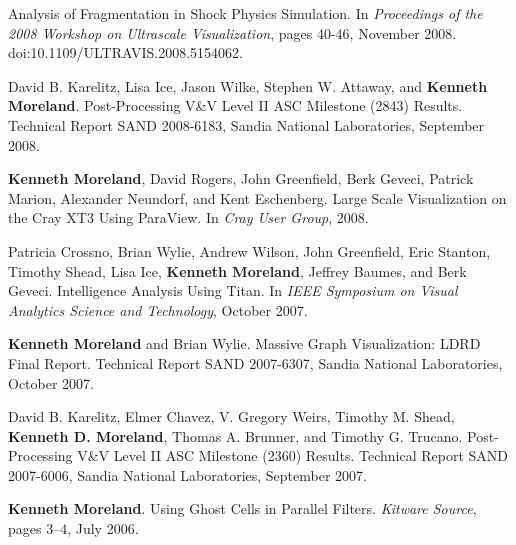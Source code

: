 \begin{enumerate}[label={[\arabic*]}, left=0pt]
  Analysis of Fragmentation in Shock Physics Simulation.
  In \emph{Proceedings of the 2008 Workshop on Ultrascale Visualization}, pages 40-46, November 2008.
  doi:10.1109/ULTRAVIS.2008.5154062.
\item  %
  David B. Karelitz, Lisa Ice, Jason Wilke, Stephen W. Attaway, and \textbf{Kenneth Moreland}.
  Post-Processing {V\&V} Level {II} {ASC} Milestone (2843) Results.
Technical Report SAND 2008-6183, Sandia National Laboratories, September 2008.
\item  %
  \textbf{Kenneth Moreland}, David Rogers, John Greenfield, Berk Geveci, Patrick Marion, Alexander Neundorf, and Kent Eschenberg.
  Large Scale Visualization on the {Cray XT3} Using ParaView.
  In \emph{Cray User Group}, 2008.
\item  %
  Patricia Crossno, Brian Wylie, Andrew Wilson, John Greenfield, Eric Stanton, Timothy Shead, Lisa Ice, \textbf{Kenneth Moreland}, Jeffrey Baumes, and Berk Geveci.
  Intelligence Analysis Using Titan.
  In \emph{IEEE Symposium on Visual Analytics Science and Technology}, October 2007.
\item  %
  \textbf{Kenneth Moreland} and Brian Wylie.
  Massive Graph Visualization: LDRD Final Report.
Technical Report SAND 2007-6307, Sandia National Laboratories, October 2007.
\item  %
  David B. Karelitz, Elmer Chavez, V. Gregory Weirs, Timothy M. Shead, \textbf{Kenneth D. Moreland}, Thomas A. Brunner, and Timothy G. Trucano.
  Post-Processing {V\&V} Level {II} {ASC} Milestone (2360) Results.
Technical Report SAND 2007-6006, Sandia National Laboratories, September 2007.
\item  %
  \textbf{Kenneth Moreland}.
  Using Ghost Cells in Parallel Filters.
  \emph{Kitware Source}, pages 3--4, July 2006.
\end{enumerate}